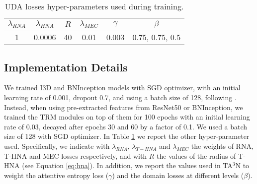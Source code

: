 \setlength{\tabcolsep}{10pt}



\begin{table}[t]
\centering
\begin{adjustbox}{width=\columnwidth, margin=0ex 1ex 0ex 0ex}
\begin{tabular}{|c|c|c|c|c|c|}
\hline
$\lambda_{RNA}$ & $\lambda_{HNA}$ & $R$ & $\lambda_{MEC}$ & $\gamma$ & $\beta$         \\ \hline
1             & 0.0006        & 40         & 0.01                     & 0.003    & 0.75, 0.75, 0.5 \\ \hline
\end{tabular}
\end{adjustbox}
\caption{UDA losses hyper-parameters used during training.} %
\label{params}
\end{table}


\subsection{Implementation Details}
We trained I3D and BNInception models with SGD optimizer, with an initial learning rate of 0.001, dropout 0.7, and using a batch size of 128, following \cite{planamente2021crossdomain}. Instead, when using pre-extracted features from ResNet50 or BNInception, we trained the TRM modules on top of them for 100 epochs with an initial learning rate of 0.03, decayed after epochs 30 and 60 by a factor of 0.1. We used a batch size of 128 with SGD optimizer. In Table \ref{params} we report the other hyper-parameter used. Specifically, we indicate with $\lambda_{RNA}$, $\lambda_{T-HNA}$ and $\lambda_{MEC}$ the weights of RNA, T-HNA and MEC losses respectively, and with $R$ the values of the radius of T-HNA (see Equation \ref{eq:hna}). In addition, we report the values used in TA$^3$N to weight the attentive entropy loss ($\gamma$) and the domain losses at different levels ($\beta$). 


